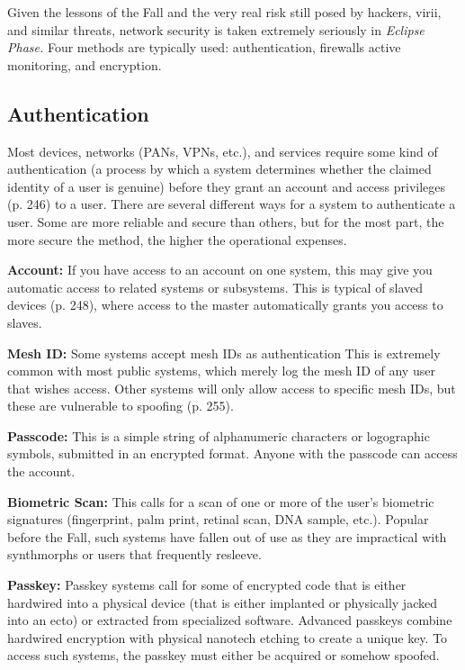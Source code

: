 Given the lessons of the Fall and the very real risk still posed by hackers, virii, and similar threats, network security is taken extremely seriously in \textit{Eclipse Phase. } Four methods are typically used: authentication, firewalls active monitoring, and encryption. 

\subsection{Authentication} 

Most devices, networks (PANs, VPNs, etc.), and services require some kind of authentication (a process by which a system determines whether the claimed identity of a user is genuine) before they grant an account and access privileges (p. 246) to a user. There are several different ways for a system to authenticate a user. Some are more reliable and secure than others, but for the most part, the more secure the method, the higher the operational expenses. 

\textbf{Account:} If you have access to an account on one system, this may give you automatic access to related systems or subsystems. This is typical of slaved devices (p. 248), where access to the master automatically grants you access to slaves. 

\textbf{Mesh ID:} Some systems accept mesh IDs as authentication This is extremely common with most public systems, which merely log the mesh ID of any user that wishes access. Other systems will only allow access to specific mesh IDs, but these are vulnerable to spoofing (p. 255). 

\textbf{Passcode:} This is a simple string of alphanumeric characters or logographic symbols, submitted in an encrypted format. Anyone with the passcode can access the account. 

\textbf{Biometric Scan:} This calls for a scan of one or more of the user's biometric signatures (fingerprint, palm print, retinal scan, DNA sample, etc.). Popular before the Fall, such systems have fallen out of use as they are impractical with synthmorphs or users that frequently resleeve. 

\textbf{Passkey:} Passkey systems call for some of encrypted code that is either hardwired into a physical device (that is either implanted or physically jacked into an ecto) or extracted from specialized software. Advanced passkeys combine hardwired encryption with physical nanotech etching to create a unique key. To access such systems, the passkey must either be acquired or somehow spoofed. 

